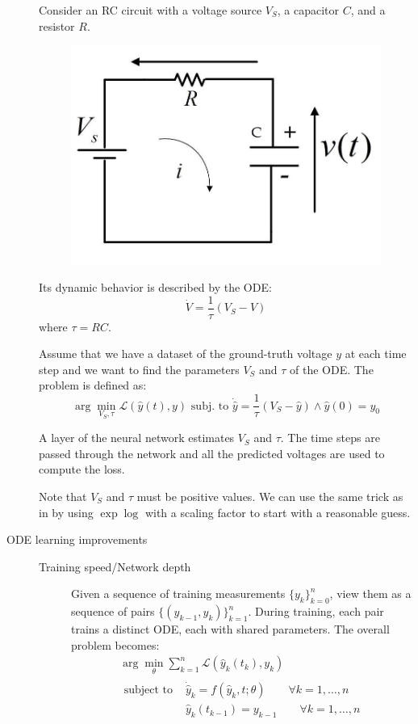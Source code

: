 \begin{description}
        \begin{example}
            Consider an RC circuit with a voltage source $V_S$, a capacitor $C$, and a resistor $R$.
            \begin{figure}[H]
                \centering
                \includegraphics[width=0.23\linewidth]{./img/rc_circuit.png}
            \end{figure}
            Its dynamic behavior is described by the ODE:
            \[ \dot{V} = \frac{1}{\tau}(V_S - V) \]
            where $\tau = RC$.

            Assume that we have a dataset of the ground-truth voltage $y$ at each time step and we want to find the parameters $V_S$ and $\tau$ of the ODE. The problem is defined as:
            \[ \arg\min_{V_S, \tau} \mathcal{L}(\hat{y}(t), y) \text{ subj. to } \dot{\hat{y}} = \frac{1}{\tau} (V_S - \hat{y}) \land \hat{y}(0) = y_0 \]

            A layer of the neural network estimates $V_S$ and $\tau$. The time steps are passed through the network and all the predicted voltages are used to compute the loss.

            Note that $V_S$ and $\tau$ must be positive values. We can use the same trick as in  by using $\exp\log$ with a scaling factor to start with a reasonable guess.
        \end{example}

    \item[ODE learning improvements]
        \phantom{}
        \begin{description}
            \item[Training speed/Network depth]
                Given a sequence of training measurements $\{ y_k \}_{k=0}^n$, view them as a sequence of pairs $\{ (y_{k-1}, y_k) \}_{k=1}^n$. During training, each pair trains a distinct ODE, each with shared parameters. The overall problem becomes:
                \[
                    \begin{gathered}
                        \arg\min_\theta \sum_{k=1}^{n} \mathcal{L}(\hat{y}_k(t_k), y_k) \\
                        \begin{split}
                            \text{subject to }& \dot{\hat{y}}_k = f(\hat{y}_k, t; \theta) \qquad\forall k = 1, \dots, n \\
                            & \hat{y}_k(t_{k-1}) = y_{k-1} \qquad\forall k = 1, \dots, n
                        \end{split}
                    \end{gathered}
                \]


\end{description}
\end{description}
